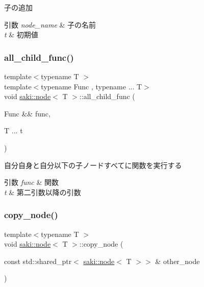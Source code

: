 子の追加 


\begin{DoxyParams}{引数}
{\em node\+\_\+name} & 子の名前 \\
\hline
{\em t} & 初期値 \\
\hline
\end{DoxyParams}
\mbox{\label{classsaki_1_1node_afff3ae61d8ebf51c352db29b8089ba41}} 
\subsubsection{\texorpdfstring{all\+\_\+child\+\_\+func()}{all\_child\_func()}}
{\footnotesize\ttfamily template$<$typename T $>$ \\
template$<$typename Func , typename ... T$>$ \\
void \mbox{\hyperlink{classsaki_1_1node}{saki\+::node}}$<$ T $>$\+::all\+\_\+child\+\_\+func (\begin{DoxyParamCaption}\item[{Func \&\&}]{func,  }\item[{T ...}]{t }\end{DoxyParamCaption})\hspace{0.3cm}{\ttfamily [inline]}}



自分自身と自分以下の子ノードすべてに関数を実行する 


\begin{DoxyParams}{引数}
{\em func} & 関数 \\
\hline
{\em t} & 第二引数以降の引数 \\
\hline
\end{DoxyParams}
\mbox{\label{classsaki_1_1node_a2edd5dac118d844a8ddf79a8c1ab98fe}} 
\subsubsection{\texorpdfstring{copy\+\_\+node()}{copy\_node()}}
{\footnotesize\ttfamily template$<$typename T $>$ \\
void \mbox{\hyperlink{classsaki_1_1node}{saki\+::node}}$<$ T $>$\+::copy\+\_\+node (\begin{DoxyParamCaption}\item[{const std\+::shared\+\_\+ptr$<$ \mbox{\hyperlink{classsaki_1_1node}{saki\+::node}}$<$ T $>$$>$ \&}]{other\+\_\+node }\end{DoxyParamCaption})\hspace{0.3cm}{\ttfamily [inline]}}



